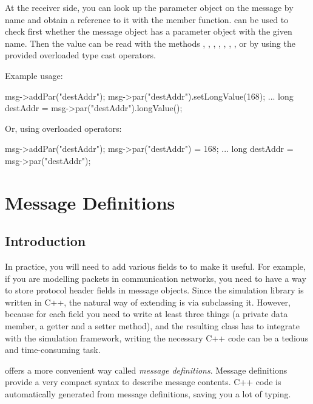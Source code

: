 At the receiver side, you can look up the parameter object on the message
by name and obtain a reference to it with the  member function.
 can be used to check first whether the message object has a parameter
object with the given name. Then the value can be read with the methods
, , ,
, , ,
, or by using the provided overloaded type cast operators.

Example usage:

\begin{cpp}
msg->addPar("destAddr");
msg->par("destAddr").setLongValue(168);
...
long destAddr = msg->par("destAddr").longValue();
\end{cpp}

Or, using overloaded operators:

\begin{cpp}
msg->addPar("destAddr");
msg->par("destAddr") = 168;
...
long destAddr = msg->par("destAddr");
\end{cpp}


\section{Message Definitions}
\label{ch:messages:message-definitions}

\subsection{Introduction}

In practice, you will need to add various fields to  to
make it useful. For example, if you are modelling packets in communication
networks, you need to have a way to store protocol header fields in message
objects. Since the simulation library is written in C++, the natural way
of extending  is via subclassing it.
However, because for each field you need to write at least
three things (a private data member, a getter and a setter method),
and the resulting class has to integrate with the simulation framework,
writing the necessary C++ code can be a tedious and time-consuming task.

{\opp} offers a more convenient way called \textit{message definitions}.
Message definitions provide a very compact syntax to describe
message contents. C++ code is automatically generated from message
definitions, saving you a lot of typing.

